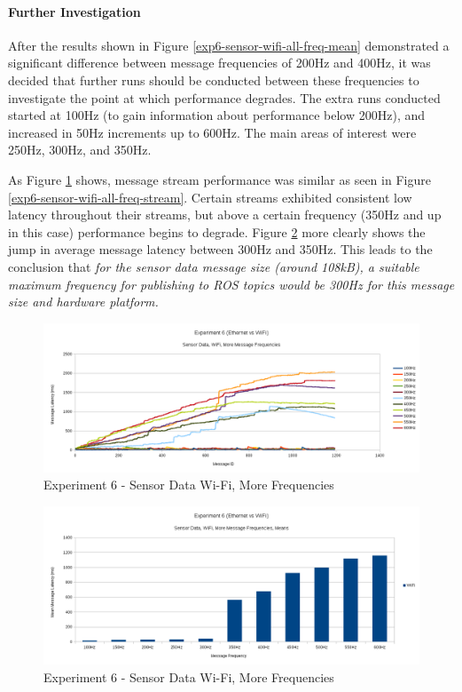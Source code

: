 \documentclass[../dissertation.tex]{subfiles}
\begin{document}
\paragraph{Further Investigation} After the results shown in Figure \ref{exp6-sensor-wifi-all-freq-mean} demonstrated a significant difference between message frequencies of 200Hz and 400Hz, it was decided that further runs should be conducted between these frequencies to investigate the point at which performance degrades. The extra runs conducted started at 100Hz (to gain information about performance below 200Hz), and increased in 50Hz increments up to 600Hz. The main areas of interest were 250Hz, 300Hz, and 350Hz.

As Figure \ref{exp6-sensor-wifi-more-freq-stream} shows, message stream performance was similar as seen in Figure \ref{exp6-sensor-wifi-all-freq-stream}. Certain streams exhibited consistent low latency throughout their streams, but above a certain frequency (350Hz and up in this case) performance begins to degrade. Figure \ref{exp6-sensor-wifi-more-freq-means} more clearly shows the jump in average message latency between 300Hz and 350Hz. This leads to the conclusion that \textit{for the sensor data message size (around 108kB), a suitable maximum frequency for publishing to ROS topics would be 300Hz for this message size and hardware platform.}

\begin{figure}[H]
\centering
\includegraphics[width=\textwidth]{images/experiment6/sensor_data_wifi_more_freqs_stream.png}
\caption{Experiment 6 - Sensor Data Wi-Fi, More Frequencies}
\label{exp6-sensor-wifi-more-freq-stream}
\end{figure}

\begin{figure}[H]
\centering
\includegraphics[width=\textwidth]{images/experiment6/sensor_data_wifi_more_freqs_means.png}
\caption{Experiment 6 - Sensor Data Wi-Fi, More Frequencies}
\label{exp6-sensor-wifi-more-freq-means}
\end{figure}
\end{document}
